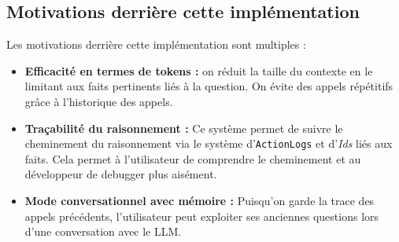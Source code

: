 \subsection{Motivations derrière cette implémentation}
Les motivations derrière cette implémentation sont multiples :
\begin{itemize}
    \item \textbf{Efficacité en termes de tokens :} on réduit la taille du contexte en le limitant aux faits pertinents liés à la question. On évite des appels répétitifs grâce à l'historique des appels.
    \item \textbf{Traçabilité du raisonnement :} Ce système permet de suivre le cheminement du raisonnement via le système d'\texttt{ActionLogs} et d'\textit{Ids} liés aux faits. Cela permet à l'utilisateur de comprendre le cheminement et au développeur de debugger plus aisément.
    \item \textbf{Mode conversationnel avec mémoire :} Puisqu'on garde la trace des appels précédents, l'utilisateur peut exploiter ses anciennes questions lors d'une conversation avec le LLM.
\end{itemize}